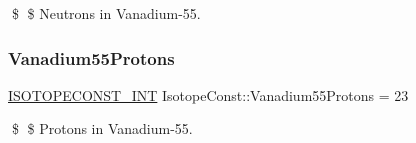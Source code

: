 \$ \$ Neutrons in Vanadium-\/55. \mbox{\label{group___isotope_const-_vanadium-_v55_ga7186ea8e5883a46f5d3f7a33b96314bb}} 
\subsubsection{\texorpdfstring{Vanadium55\+Protons}{Vanadium55Protons}}
{\footnotesize\ttfamily \mbox{\hyperlink{group___isotope_const-_macros_ga5f18360b3e99483a35c32d789e62621c}{I\+S\+O\+T\+O\+P\+E\+C\+O\+N\+S\+T\+\_\+\+I\+NT}} Isotope\+Const\+::\+Vanadium55\+Protons = 23}

\$ \$ Protons in Vanadium-\/55. 